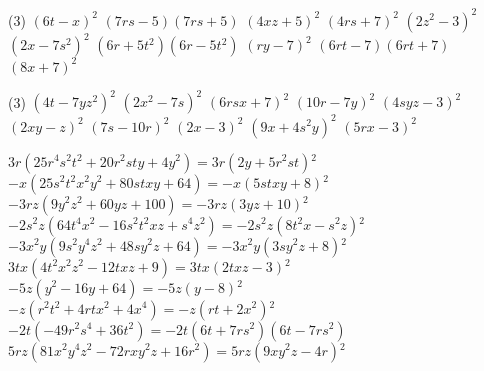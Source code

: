 \documentclass[a4paper,12pt]{report}
\begin{document}
\begin{core}\phantom{ }

\begin{tasks}(3)
\task ${{\left(6 t-x\right)^2}}$
\task ${{\left(7 r s- 5 \right)\left(7 r s+5 \right)}}$
\task ${{\left(4 x z+5 \right)^2}}$
\task ${{\left(4 r s+7 \right)^2}}$
\task ${{\left(2 z^2-3 \right)^2}}$
\task ${{\left(2 x-7 s^2\right)^2}}$
\task ${{\left(6 r+ 5 t^2\right)\left(6 r-5 t^2\right)}}$
\task ${{\left(r y-7 \right)^2}}$
\task ${{\left(6 r t- 7 \right)\left(6 r t+7 \right)}}$
\task ${{\left(8 x+7 \right)^2}}$
\end{tasks}

\end{core}

\begin{core}\phantom{ }

\begin{tasks}(3)
\task ${{\left(4 t-7 y z^2\right)^2}}$
\task ${{\left(2 x^2-7 s\right)^2}}$
\task ${{\left(6 r s x+7 \right)^2}}$
\task ${{\left(10 r-7 y\right)^2}}$
\task ${{\left(4 s y z-3 \right)^2}}$
\task ${{\left(2 x y-z\right)^2}}$
\task ${{\left(7 s-10 r\right)^2}}$
\task ${{\left(2 x-3 \right)^2}}$
\task ${{\left(9 x+4 s^2 y\right)^2}}$
\task ${{\left(5 r x-3 \right)^2}}$
\end{tasks}

\end{core}

\begin{core}\phantom{ }

\begin{tasks}
\task ${{3 r}}\mathopen{}\left(25 r^4 s^2 t^2 + 20 r^2 s t y + 4 y^2\right)\mathclose{}={{3 r\mathopen{}\left(2 y+5 r^2 s t\right)\mathclose{}^2}}$
\task ${{-x}}\mathopen{}\left(25 s^2 t^2 x^2 y^2 + 80 s t x y + 64 \right)\mathclose{}={{-x\mathopen{}\left(5 s t x y+8 \right)\mathclose{}^2}}$
\task ${{-3 r z}}\mathopen{}\left(9 y^2 z^2 + 60 y z + 100 \right)\mathclose{}={{-3 r z\mathopen{}\left(3 y z+10 \right)\mathclose{}^2}}$
\task ${{-2 s^2 z}}\mathopen{}\left(64 t^4 x^2-16 s^2 t^2 x z + s^4 z^2\right)\mathclose{}={{-2 s^2 z\mathopen{}\left(8 t^2 x-s^2 z\right)\mathclose{}^2}}$
\task ${{-3 x^2 y}}\mathopen{}\left(9 s^2 y^4 z^2 + 48 s y^2 z + 64 \right)\mathclose{}={{-3 x^2 y\mathopen{}\left(3 s y^2 z+8 \right)\mathclose{}^2}}$
\task ${{3 t x}}\mathopen{}\left(4 t^2 x^2 z^2-12 t x z + 9 \right)\mathclose{}={{3 t x\mathopen{}\left(2 t x z-3 \right)\mathclose{}^2}}$
\task ${{-5 z}}\mathopen{}\left(y^2-16 y + 64 \right)\mathclose{}={{-5 z\mathopen{}\left(y-8 \right)\mathclose{}^2}}$
\task ${{-z}}\mathopen{}\left(r^2 t^2 + 4 r t x^2 + 4 x^4\right)\mathclose{}={{-z\mathopen{}\left(r t+2 x^2\right)\mathclose{}^2}}$
\task ${{-2 t}}\mathopen{}\left(-49 r^2 s^4 + 36 t^2\right)\mathclose{}={{-2 t\mathopen{}\left(6 t+ 7 r s^2\right)\mathclose{}\mathopen{}\left(6 t-7 r s^2\right)\mathclose{}}}$
\task ${{5 r z}}\mathopen{}\left(81 x^2 y^4 z^2-72 r x y^2 z + 16 r^2\right)\mathclose{}={{5 r z\mathopen{}\left(9 x y^2 z-4 r\right)\mathclose{}^2}}$
\end{tasks}

\end{core}
\end{document}
